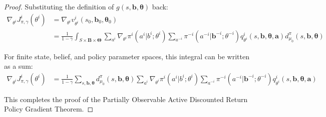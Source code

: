 \documentclass[a4paper,12pt]{report}
\begin{document}
\begin{proof}
    Substituting the definition of $g(s, \boldsymbol{b}, \boldsymbol{\theta})$ back:
    \begin{align}
        \nabla_{\theta^i}J^{i}_{\pi, \gamma}(\theta^{i}) & = \nabla_{\theta^i}v^{i}_{\theta^i}(s_{0}, \boldsymbol{b}_{0}, \boldsymbol{\theta}_{0})                                                                                                                                                                                                                                                  \\
                                                         & = \frac{1}{1-\gamma}\int_{S \times \boldsymbol{B} \times \boldsymbol{\Theta}}\sum_{a^i}\nabla_{\theta^i}\pi^{i}(a^{i}|b^{i}; \theta^{i}) \sum_{a^{-i}}\pi^{-i}(a^{-i}|\boldsymbol{b}^{-i}; \theta^{-i}) q^{i}_{\theta^i}(s, \boldsymbol{b}, \boldsymbol{\theta}, \boldsymbol{a}) d^{\pi}_{\mu_0}(s, \boldsymbol{b}, \boldsymbol{\theta})
    \end{align}

    For finite state, belief, and policy parameter spaces, this integral can be
    written as a sum:
    \begin{align}
        \nabla_{\theta^i}J^{i}_{\pi, \gamma}(\theta^{i}) & = \frac{1}{1-\gamma}\sum_{s, \boldsymbol{b}, \boldsymbol{\theta}}d^{\pi}_{\mu_0}(s, \boldsymbol{b}, \boldsymbol{\theta}) \sum_{a^i}\nabla_{\theta^i}\pi^{i}(a^{i}|b^{i}; \theta^{i}) \sum_{a^{-i}}\pi^{-i}(a^{-i}|\boldsymbol{b}^{-i}; \theta^{-i}) q^{i}_{\theta^i}(s, \boldsymbol{b}, \boldsymbol{\theta}, \boldsymbol{a})
    \end{align}

    This completes the proof of the Partially Observable Active Discounted Return
    Policy Gradient Theorem.
\end{proof}
\end{document}
